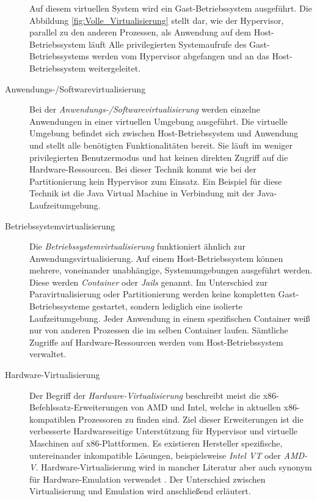 \begin{description}
        Auf diesem virtuellen System wird ein Gast-Betriebssystem ausgeführt.
        Die Abbildung \ref{fig:Volle_Virtualisierung} stellt dar, wie der
        Hypervisor, parallel zu den anderen Prozessen, als Anwendung auf dem
        Host-Betriebssystem läuft
        Alle privilegierten Systemaufrufe des Gast-Betriebssystems werden vom
        Hypervisor abgefangen und an das Host-Betriebssystem weitergeleitet.
    \item[Anwendungs-/Softwarevirtualisierung]
        Bei der \textit{Anwendungs-/Softwarevirtualisierung} werden einzelne
        Anwendungen in einer virtuellen Umgebung ausgeführt.
        Die virtuelle Umgebung befindet sich zwischen Host-Betriebssystem und
        Anwendung und stellt alle benötigten Funktionalitäten bereit.
        Sie läuft im weniger privilegierten Benutzermodus und hat keinen
        direkten Zugriff auf die Hardware-Ressourcen\cite{BSKompakt_Virt}.
        Bei dieser Technik kommt wie bei der Partitionierung kein Hypervisor
        zum Einsatz.
        Ein Beispiel für diese Technik ist die Java Virtual Machine in
        Verbindung mit der Java-Laufzeitumgebung.
    \item[Betriebssystemvirtualisierung]
        Die \textit{Betriebssystemvirtualisierung} funktioniert ähnlich zur
        Anwendungsvirtualisierung.
        Auf einem Host-Betriebssystem können mehrere, voneinander unabhängige,
        Systemumgebungen ausgeführt werden\cite{BSKompakt_Virt}.
        Diese werden \textit{Container} oder \textit{Jails} genannt.
        Im Unterschied zur Paravirtualisierung oder Partitionierung werden
        keine kompletten Gast-Betriebssysteme gestartet, sondern lediglich eine
        isolierte Laufzeitumgebung.
        Jeder Anwendung in einem spezifischen Container weiß nur von anderen
        Prozessen die im selben Container laufen.
        Sämtliche Zugriffe auf Hardware-Ressourcen werden vom
        Host-Betriebssystem verwaltet.
    \item[Hardware-Virtualisierung]
        Der Begriff der \textit{Hardware-Virtualisierung} beschreibt meist die
        x86-Befehlssatz-Erweiterungen von AMD und Intel, welche in aktuellen
        x86-kompatiblen Prozessoren zu finden sind\cite{BSKompakt_Virt}.
        Ziel dieser Erweiterungen ist die verbesserte Hardwareseitige
        Unterstützung für Hypervisor und virtuelle Maschinen auf
        x86-Plattformen.
        Es existieren Hersteller spezifische, untereinander inkompatible
        Lösungen, beispielsweise \textit{Intel VT} oder \textit{AMD-V}.
        Hardware-Virtualisierung wird in mancher Literatur aber auch synonym
        für Hardware-Emulation verwendet
        \cite{MasterkursVirtParaSys_Virt}.
        Der Unterschied zwischen Virtualisierung und Emulation wird
        anschließend erläutert.
\end{description}
\vspace{1ex}

